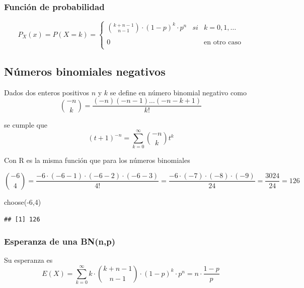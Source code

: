 \documentclass[
]{article}
\newenvironment{Shaded}{\begin{snugshade}}{\end{snugshade}}
\newcommand{\DecValTok}[1]{\textcolor[rgb]{0.00,0.00,0.81}{#1}}
\newcommand{\FunctionTok}[1]{\textcolor[rgb]{0.00,0.00,0.00}{#1}}
\newcommand{\NormalTok}[1]{#1}
\newcommand{\SpecialCharTok}[1]{\textcolor[rgb]{0.00,0.00,0.00}{#1}}
\begin{document}
\hypertarget{funciuxf3n-de-probabilidad}{%
\subsubsection{Función de
probabilidad}\label{funciuxf3n-de-probabilidad}}

\[P_X(x) = P(X=k) = \left\{\begin{array}{lcr}
  {k+n-1 \choose n-1}\cdot (1-p)^k \cdot p^n&si&k=0,1,\ldots\\\\
  0&&\mbox{en otro caso}\\
\end{array}\right.\]

\hypertarget{nuxfameros-binomiales-negativos}{%
\subsection{Números binomiales
negativos}\label{nuxfameros-binomiales-negativos}}

Dados dos enteros positivos \(n\) y \(k\) se define en número binomial
negativo como \[{-n\choose k} = \dfrac{(-n)(-n-1)\ldots (-n-k+1)}{k!}\]

se cumple que
\[(t+1)^{-n} = \sum\limits_{k=0}^{\infty} {-n \choose k} t^k\]

Con R es la misma función que para los números binomiales

\[{-6 \choose 4} = \dfrac{-6\cdot (-6-1)\cdot (-6-2) \cdot (-6-3) }{4!} = \dfrac{-6\cdot (-7)\cdot (-8)\cdot (-9)}{24} = \dfrac{3024}{24} = 126\]

\begin{Shaded}
\begin{Highlighting}[]
\FunctionTok{choose}\NormalTok{(}\SpecialCharTok{{-}}\DecValTok{6}\NormalTok{,}\DecValTok{4}\NormalTok{)}
\end{Highlighting}
\end{Shaded}

\begin{verbatim}
## [1] 126
\end{verbatim}

\hypertarget{esperanza-de-una-bnnp}{%
\subsubsection{Esperanza de una BN(n,p)}\label{esperanza-de-una-bnnp}}

Su esperanza es
\[E(X) = \sum\limits_{k=0}^\infty k \cdot {k+n-1 \choose n-1} \cdot (1-p)^k \cdot p^n = n\cdot \dfrac{1-p}{p}\]
\end{document}
